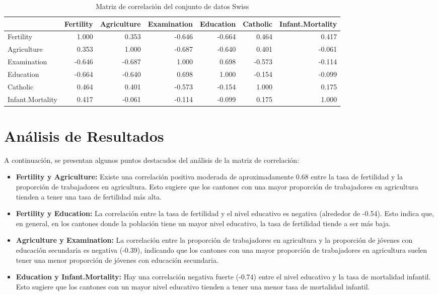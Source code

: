 \documentclass{article}
\begin{document}
\begin{table}[ht]
    \centering
    \begin{adjustbox}{max width=\textwidth}
    \begin{tabular}{lrrrrrr}
    \hline
     & Fertility & Agriculture & Examination & Education & Catholic & Infant.Mortality \\ 
    \hline
    Fertility & 1.000 & 0.353 & -0.646 & -0.664 & 0.464 & 0.417 \\ 
    Agriculture & 0.353 & 1.000 & -0.687 & -0.640 & 0.401 & -0.061 \\ 
    Examination & -0.646 & -0.687 & 1.000 & 0.698 & -0.573 & -0.114 \\ 
    Education & -0.664 & -0.640 & 0.698 & 1.000 & -0.154 & -0.099 \\ 
    Catholic & 0.464 & 0.401 & -0.573 & -0.154 & 1.000 & 0.175 \\ 
    Infant.Mortality & 0.417 & -0.061 & -0.114 & -0.099 & 0.175 & 1.000 \\ 
    \hline
    \end{tabular}
    \end{adjustbox}
    \caption{Matriz de correlación del conjunto de datos Swiss}
    \label{tab:correlation_matrix_swiss}
\end{table}


\section{Análisis de Resultados}

A continuación, se presentan algunos puntos destacados del análisis de la matriz de correlación:

\begin{itemize}
    \item \textbf{Fertility y Agriculture:} Existe una correlación positiva moderada de aproximadamente 0.68 entre la tasa de fertilidad y la proporción de trabajadores en agricultura. Esto sugiere que los cantones con una mayor proporción de trabajadores en agricultura tienden a tener una tasa de fertilidad más alta.
    \item \textbf{Fertility y Education:} La correlación entre la tasa de fertilidad y el nivel educativo es negativa (alrededor de -0.54). Esto indica que, en general, en los cantones donde la población tiene un mayor nivel educativo, la tasa de fertilidad tiende a ser más baja.
    \item \textbf{Agriculture y Examination:} La correlación entre la proporción de trabajadores en agricultura y la proporción de jóvenes con educación secundaria es negativa (-0.39), indicando que los cantones con una mayor proporción de trabajadores en agricultura suelen tener una menor proporción de jóvenes con educación secundaria.
    \item \textbf{Education y Infant.Mortality:} Hay una correlación negativa fuerte (-0.74) entre el nivel educativo y la tasa de mortalidad infantil. Esto sugiere que los cantones con un mayor nivel educativo tienden a tener una menor tasa de mortalidad infantil.
\end{itemize}
\end{document}
